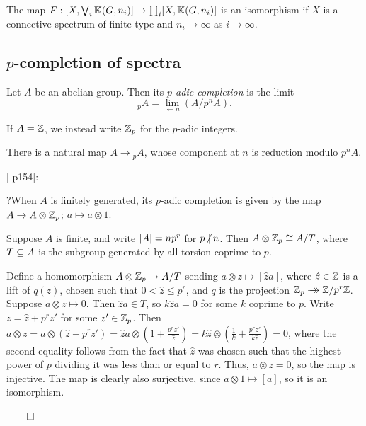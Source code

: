 \documentclass{MetricNotes2023}
\newcommand{\surj}{\rightarrow\mathrel{\mkern-14mu}\rightarrow}
\def\bb{\ensuremath\mathbb}
\def\subq{\ensuremath\subseteq}
\def\inte{\ensuremath\mathbb{Z}}
\def\done{\begin{flushright}\vspace{-4.35ex}\(\qed\)\end{flushright}}
\def\nvert{\ensuremath\hspace{-0.5ex}\not\vert\hspace{0.5ex}}
\begin{document}
\begin{proposition}\label{2503231218}
The map \(F : [X, \bigvee_i \bb{K}(G,n_i)]\to \prod_i [X,\bb{K}(G,n_i)]\) is an isomorphism if \(X\) is a connective spectrum of finite type and \(n_i\to \infty\) as \(i\to\infty\). 
\end{proposition}

\subsection{\(p\)-completion of spectra}

\begin{definition}
Let \(A\) be an abelian group. Then its \textit{\(p\)-adic completion} is the limit 
\[\text{}_pA=\lim\limits_{\leftarrow n} (A/p^nA).\]
\end{definition}

If \(A=\inte\), we instead write \(\inte_p\) for the \(p\)-adic integers.

There is a natural map \(A \to \text{}_pA\), whose component at \(n\) is reduction modulo \(p^nA\). 

[\autocite{concise} p154]:

?When \(A\) is finitely generated, its \(p\)-adic completion is given by the map \(A \to A\otimes \inte_p\); \(a\mapsto a\otimes 1\). 

\begin{lemma}\label{2504031247}
Suppose \(A\) is finite, and write \(\lvert A\rvert=np^r\) for \(p\nvert n\). Then \(A\otimes\inte_p\cong A/T\), where \(T\subq A\) is the subgroup generated by all torsion coprime to \(p\).
\end{lemma}

\begin{ourproof}
Define a homomorphism \(A\otimes\inte_p\to A/T\) sending \(a\otimes z \mapsto [\hat za]\), where \(\hat z\in \inte\) is a lift of \(q(z)\), chosen such that \(0 < \hat z \leq p^{r}\), and \(q\) is the projection \(\inte_p \surj \inte/p^r\inte\). Suppose \(a\otimes z\mapsto 0\).  Then \(\hat za\in T\), so \(k\hat za=0\) for some \(k\) coprime to \(p\). Write \(z=\hat z + p^rz'\) for some \(z'\in\inte_p\). Then \(a\otimes z = a\otimes(\hat z + p^r z')=\hat za\otimes(1 + \frac{p^rz'}{\hat z})=k\hat z\otimes(\frac{1}{k}+\frac{p^rz'}{k\hat z})=0\), where the second  equality follows from the fact that \(\hat z\) was chosen such that the highest power of \(p\) dividing it was less than or equal to \(r\).%
\text{ }Thus, \(a\otimes z = 0\), so the map is injective. The map is clearly also surjective, since \(a\otimes 1 \mapsto [a]\), so it is an isomorphism. \done
\end{ourproof}
\end{document}
